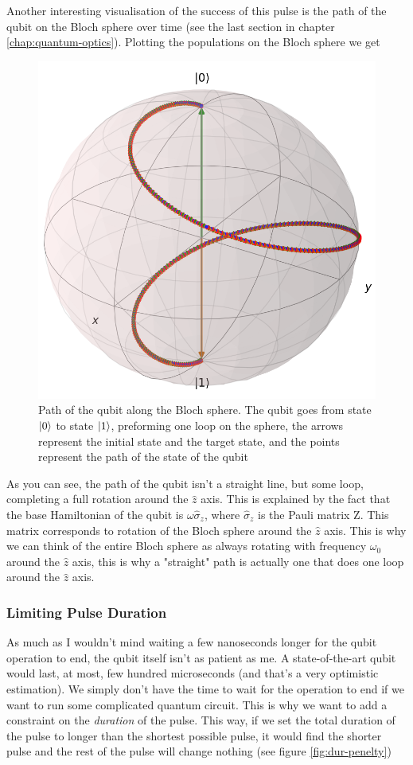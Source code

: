 Another interesting visualisation of the success of this pulse is the path of the qubit on the Bloch sphere over time (see the last section in chapter \ref{chap:quantum-optics}). Plotting the populations on the Bloch sphere we get 
\begin{figure}[H]
    \centering
    \includegraphics[width=0.4\columnwidth]{Results/qubit-band-amp-const/Bloch-qubit.png}
    \caption{Path of the qubit along the Bloch sphere. The qubit goes from state $\ket{0}$ to state $\ket{1}$, preforming one loop on the sphere, the arrows represent the initial state and the target state, and the points represent the path of the state of the qubit}
    \label{fig:band-amp-const-blcoh}
\end{figure}
As you can see, the path of the qubit isn't a straight line, but some loop, completing a full rotation around the $\hat{z}$ axis. This is explained by the fact that the base Hamiltonian of the qubit is $\omega \hat{\sigma}_z$, where $\hat{\sigma}_z$ is the Pauli matrix Z. This matrix corresponds to rotation of the Bloch sphere around the $\hat{z}$ axis. This is why we can think of the entire Bloch sphere as always rotating with frequency $\omega_0$ around the $\hat{z}$ axis, this is why a "straight" path is actually one that does one loop around the $\hat{z}$ axis.

\subsubsection{Limiting Pulse Duration}
As much as I wouldn't mind waiting a few nanoseconds longer for the qubit operation to end, the qubit itself isn't as patient as me. A state-of-the-art qubit would last, at most, few hundred microseconds (and that's a very optimistic estimation). We simply don't have the time to wait for the operation to end if we want to run some complicated quantum circuit. This is why we want to add a constraint on the \textit{duration} of the pulse. This way, if we set the total duration of the pulse to longer than the shortest possible pulse, it would find the shorter pulse and the rest of the pulse will change nothing (see figure \ref{fig:dur-penelty})

